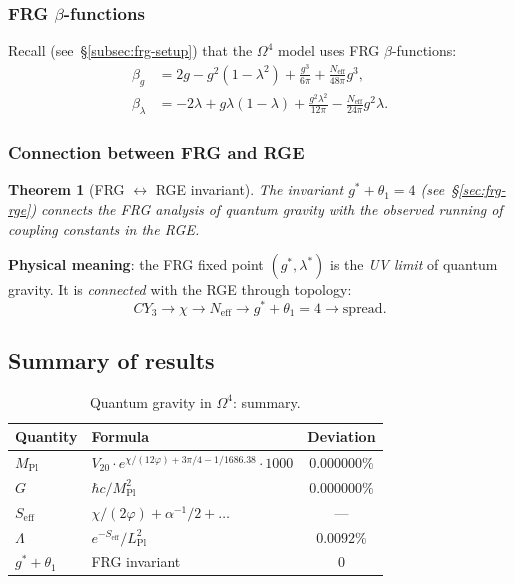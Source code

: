 \documentclass[11pt,a4paper]{article}
\newcommand{\CY}{\ensuremath{CY_3}}
\newcommand{\Om}{\ensuremath{\Omega^4}}
\newtheorem{theorem}{Theorem}[section]
\theoremstyle{definition}
\begin{document}
\subsubsection{FRG \texorpdfstring{$\beta$}{}-functions}

Recall (see~\S\ref{subsec:frg-setup}) that the $\Om$ model
uses FRG $\beta$-functions:
\begin{align}
    \beta_g &= 2g - g^2(1 - \lambda^2) + \frac{g^3}{6\pi}
    + \frac{N_{\text{eff}}}{48\pi} g^3, \\
    \beta_\lambda &= -2\lambda + g\lambda(1-\lambda)
    + \frac{g^2 \lambda^2}{12\pi}
    - \frac{N_{\text{eff}}}{24\pi} g^2 \lambda.
\end{align}

\subsubsection{Connection between FRG and RGE}

\begin{theorem}[FRG $\leftrightarrow$ RGE invariant]
\label{thm:qg-frg-rge}
The invariant $g^* + \theta_1 = 4$ (see~\S\ref{sec:frg-rge})
connects the FRG analysis of quantum gravity with the observed
running of coupling constants in the RGE.
\end{theorem}

\medskip\noindent
\textbf{Physical meaning}: the FRG fixed point $(g^*, \lambda^*)$
is the \emph{UV limit} of quantum gravity. It is
\emph{connected} with the RGE through topology:
\begin{equation}
    \CY \to \chi \to N_{\text{eff}} \to g^* + \theta_1 = 4
    \to \text{spread}.
\end{equation}

\subsection{Summary of results}
\label{subsec:qg-summary}

\begin{table}[ht]
\centering
\caption{Quantum gravity in \texorpdfstring{$\Om$}{}: summary.}
\label{tab:qg-summary}
\begin{tabular}{llc}
\toprule
Quantity & Formula & Deviation \\
\midrule
$M_{\text{Pl}}$ & $V_{20} \cdot e^{\chi/(12\varphi) + 3\pi/4 - 1/1686.38} \cdot 1000$
    & $0.000000\%$ \\
$G$ & $\hbar c / M_{\text{Pl}}^2$ & $0.000000\%$ \\
$S_{\text{eff}}$ & $\chi/(2\varphi) + \alpha^{-1}/2 + \ldots$
    & --- \\
$\Lambda$ & $e^{-S_{\text{eff}}} / L_{\text{Pl}}^2$ & $0.0092\%$ \\
$g^* + \theta_1$ & FRG invariant & $0$ \\
\bottomrule
\end{tabular}
\end{table}
\end{document}
